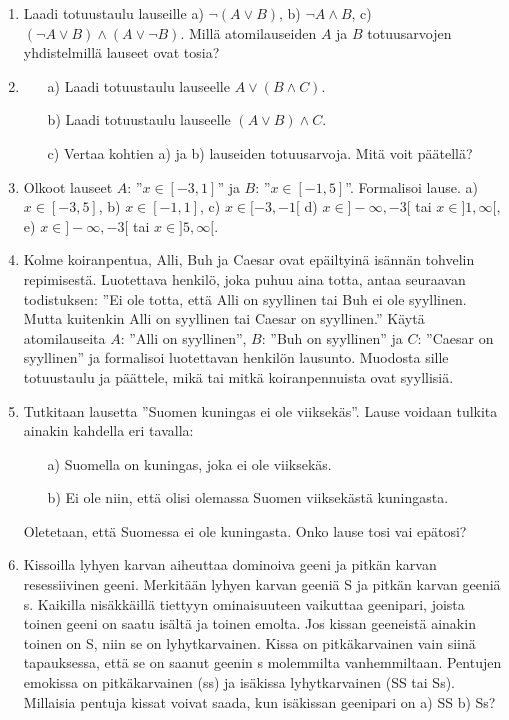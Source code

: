 \begin{enumerate}
\item
Laadi totuustaulu lauseille a) $\lnot(A\lor B)$,  b)  $\lnot A\land B$,  c) $ (\lnot A\lor B)\land (A\lor \lnot B)$. Millä atomilauseiden $A$ ja  $B$ totuusarvojen yhdistelmillä lauseet ovat tosia?

\item
\begin{itemize}
\item[a)] Laadi totuustaulu lauseelle $A\lor (B\land C)$.  
\item[b)] Laadi totuustaulu lauseelle $(A\lor B)\land C$. 
\item[c)] Vertaa kohtien a) ja b) lauseiden totuusarvoja. Mitä voit päätellä?
\end{itemize}

\item Olkoot lauseet $A$: ''$x\in [-3,1]$'' ja $B$: ''$ x \in [-1,5]$''. Formalisoi lause.
a) $x\in [-3,5]$, b) $x\in [-1,1]$,   c)  $x\in [-3,-1[$  d)  $x\in ]-\infty,-3[$  tai $x\in ]1,\infty[$, 
e) $x\in]-\infty,-3[$  tai $x\in ]5,\infty[$.  

\item Kolme koiranpentua, Alli, Buh ja Caesar ovat epäiltyinä isännän tohvelin repimisestä. Luotettava henkilö, joka puhuu aina totta, antaa seuraavan todistuksen: ''Ei ole totta, että Alli on syyllinen tai Buh ei ole syyllinen. Mutta kuitenkin Alli on syyllinen tai Caesar on syyllinen.'' Käytä atomilauseita $A$: ''Alli on syyllinen'', $B$: ''Buh on syyllinen'' ja $C$: ''Caesar on syyllinen'' ja formalisoi luotettavan henkilön lausunto. Muodosta sille totuustaulu ja päättele, mikä tai mitkä koiranpennuista ovat syyllisiä. 

\item Tutkitaan lausetta ''Suomen kuningas ei ole viiksekäs''. Lause voidaan tulkita ainakin kahdella eri tavalla:
\begin{itemize}
\item[a)] Suomella on kuningas, joka ei ole viiksekäs.
\item[b)] Ei ole niin, että olisi olemassa Suomen viiksekästä kuningasta.
\end{itemize}
Oletetaan, että Suomessa ei ole kuningasta. Onko lause tosi vai epätosi?

\item
Kissoilla lyhyen karvan aiheuttaa dominoiva geeni ja pitkän karvan resessiivinen geeni. Merkitään lyhyen karvan geeniä S ja pitkän karvan geeniä s. Kaikilla nisäkkäillä tiettyyn ominaisuuteen vaikuttaa geenipari, joista toinen geeni on saatu isältä ja toinen emolta. Jos kissan geeneistä ainakin toinen on S, niin se on lyhytkarvainen. Kissa on pitkäkarvainen vain siinä tapauksessa, että se on saanut geenin s molemmilta vanhemmiltaan.  Pentujen emokissa on pitkäkarvainen (ss) ja isäkissa lyhytkarvainen (SS tai Ss). Millaisia pentuja kissat voivat saada, kun isäkissan geenipari on a) SS b) Ss?

\end{enumerate}


